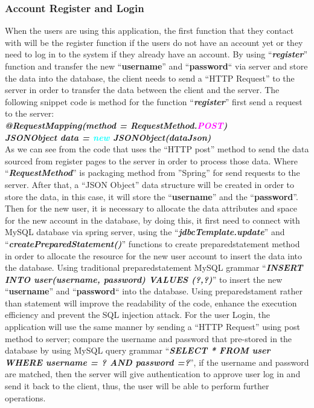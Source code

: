 \documentclass[12pt]{article}
\begin{document}
\subsubsection{Account Register and Login}
When the users are using this application, the first function that they contact with will be the register function if the users do not have an account yet or they need to log in to the system if they already have an account. By using ``\textit{\textbf{register}}'' function and transfer the new ``\textbf{username}'' and ``\textbf{password}`` via server and store the data into the database, the client needs to send a ``HTTP Request'' to the server in order to transfer the data between the client and the server. The following snippet code is method for the function ``\textit{\textbf{register}}'' first send a request to the server:
\\\textit{\textbf{@RequestMapping(method = RequestMethod.\textcolor{magenta}{POST})}}
\\\textit{\textbf{JSONObject data = \textcolor{cyan}{new} JSONObject(dataJson)}}
\\
As we can see from the code that uses the ``HTTP post'' method to send the data sourced from register pages to the server in order to process those data. Where ``\textit{\textbf{RequestMethod}}'' is packaging method from ''Spring'' for send requests to the server. After that, a ``JSON Object'' data structure will be created in order to store the data, in this case, it will store the ``\textbf{username}'' and the ``\textbf{password}''. Then for the new user, it is necessary to allocate the data attributes and space for the new account in the database, by doing this, it first need to connect with MySQL database via spring server, using the ``\textit{\textbf{jdbcTemplate.update}}'' and ``\textit{\textbf{createPreparedStatement()}}'' functions to create preparedstatement method in order to allocate the resource for the new user account to insert the data into the database. Using traditional preparedstatement MySQL grammar ``\textit{\textbf{INSERT INTO user(username, password) VALUES (?,?)}}'' to insert the new ``\textbf{username}'' and ``\textbf{password}`` into the database. Using preparedstament rather than statement will improve the readability of the code, enhance the execution efficiency and prevent the SQL injection attack. For the user Login, the application will use the same manner by sending a ``HTTP Request'' using post method to server; compare the username and password that pre-stored in the database by using MySQL query grammar ``\textit{\textbf{SELECT * FROM user WHERE username = ? AND password =?}}'', if the username and password are matched, then the server will give authentication to approve user log in and send it back to the client, thus, the user will be able to perform further operations.
\end{document}

